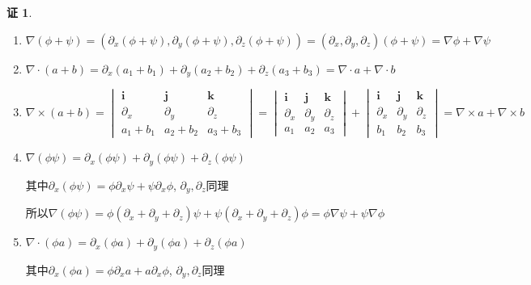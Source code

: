 \documentclass[a4paper,12pt]{article}
\theoremstyle{definition}
\newtheorem*{pf}{证}
\begin{document}
\begin{pf}
    \begin{enumerate}
        \item $\nabla(\phi+\psi)=(\partial_x(\phi+\psi), \partial_y(\phi+\psi), \partial_z(\phi+\psi))=(\partial_x,\partial_y,\partial_z)(\phi+\psi)=\nabla\phi+\nabla\psi$
        \item $\nabla\cdot(a+b)=\partial_x(a_1+b_1)+\partial_y(a_2+b_2)+\partial_z(a_3+b_3)=\nabla\cdot a+\nabla\cdot b$
        \item $\nabla\times(a+b)=\begin{vmatrix}
                      \boldsymbol{i} & \boldsymbol{j} & \boldsymbol{k} \\
                      \partial_x     & \partial_y     & \partial_z     \\
                      a_1+b_1        & a_2+b_2        & a_3+b_3
                  \end{vmatrix}=\begin{vmatrix}
                      \boldsymbol{i} & \boldsymbol{j} & \boldsymbol{k} \\
                      \partial_x     & \partial_y     & \partial_z     \\
                      a_1            & a_2            & a_3
                  \end{vmatrix}+\begin{vmatrix}
                      \boldsymbol{i} & \boldsymbol{j} & \boldsymbol{k} \\
                      \partial_x     & \partial_y     & \partial_z     \\
                      b_1            & b_2            & b_3
                  \end{vmatrix}=\nabla\times a+\nabla\times b$
        \item $\nabla(\phi\psi)=\partial_x(\phi\psi)+\partial_y(\phi\psi)+\partial_z(\phi\psi)$

              其中$\partial_x(\phi\psi)=\phi\partial_x\psi+\psi\partial_x\phi$, $\partial_y,\partial_z$同理

              所以$\nabla(\phi\psi)=\phi(\partial_x+\partial_y+\partial_z)\psi+\psi(\partial_x+\partial_y+\partial_z)\phi=\phi\nabla\psi+\psi\nabla\phi$
        \item $\nabla\cdot(\phi a)=\partial_x(\phi a)+\partial_y(\phi a)+\partial_z(\phi a)$

              其中$\partial_x(\phi a)=\phi\partial_x a+ a\partial_x\phi$, $\partial_y,\partial_z$同理


\end{enumerate}
\end{pf}
\end{document}
